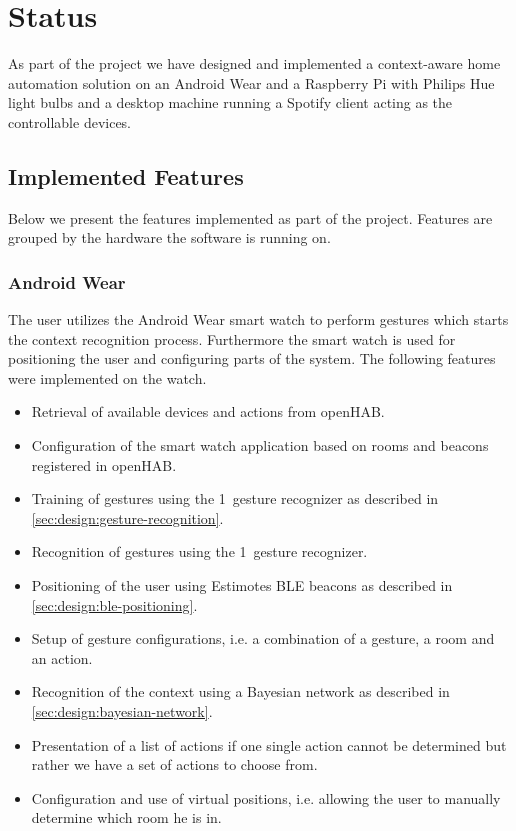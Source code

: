 \section{Status}
\label{sec:implementation:status}

As part of the project we have designed and implemented a context-aware home automation solution on an Android Wear and a Raspberry Pi with Philips Hue light bulbs and a desktop machine running a Spotify client acting as the controllable devices. 


\subsection{Implemented Features}

Below we present the features implemented as part of the project. Features are grouped by the hardware the software is running on.

\subsubsection{Android Wear}

The user utilizes the Android Wear smart watch to perform gestures which starts the context recognition process. Furthermore the smart watch is used for positioning the user and configuring parts of the system. The following features were implemented on the watch.

\begin{itemize}
\item Retrieval of available devices and actions from openHAB.
\item Configuration of the smart watch application based on rooms and beacons registered in openHAB.
\item Training of gestures using the 1\textcent~gesture recognizer as described in \cref{sec:design:gesture-recognition}.
\item Recognition of gestures using the 1\textcent~gesture recognizer.
\item Positioning of the user using Estimotes BLE beacons as described in \cref{sec:design:ble-positioning}.
\item Setup of gesture configurations, i.e. a combination of a gesture, a room and an action.
\item Recognition of the context using a Bayesian network as described in \cref{sec:design:bayesian-network}.
\item Presentation of a list of actions if one single action cannot be determined but rather we have a set of actions to choose from.
\item Configuration and use of virtual positions, i.e. allowing the user to manually determine which room he is in.
\end{itemize}

